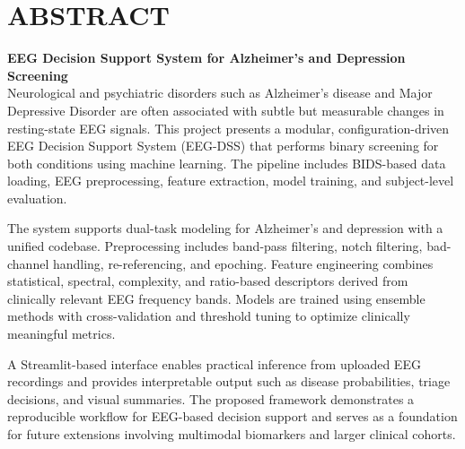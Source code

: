 \documentclass[12pt,a4paper]{report}
\begin{document}
\clearpage

\chapter*{ABSTRACT}
\textbf{EEG Decision Support System for Alzheimer's and Depression Screening}\\[0.5cm]
\justifying
Neurological and psychiatric disorders such as Alzheimer's disease and Major Depressive Disorder are often associated with subtle but measurable changes in resting-state EEG signals. This project presents a modular, configuration-driven EEG Decision Support System (EEG-DSS) that performs binary screening for both conditions using machine learning. The pipeline includes BIDS-based data loading, EEG preprocessing, feature extraction, model training, and subject-level evaluation. 

The system supports dual-task modeling for Alzheimer's and depression with a unified codebase. Preprocessing includes band-pass filtering, notch filtering, bad-channel handling, re-referencing, and epoching. Feature engineering combines statistical, spectral, complexity, and ratio-based descriptors derived from clinically relevant EEG frequency bands. Models are trained using ensemble methods with cross-validation and threshold tuning to optimize clinically meaningful metrics. 

A Streamlit-based interface enables practical inference from uploaded EEG recordings and provides interpretable output such as disease probabilities, triage decisions, and visual summaries. The proposed framework demonstrates a reproducible workflow for EEG-based decision support and serves as a foundation for future extensions involving multimodal biomarkers and larger clinical cohorts.

\clearpage

\renewcommand{\contentsname}{CONTENTS}
\tableofcontents
{}
\clearpage

\end{document}
